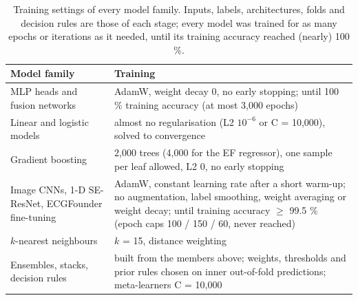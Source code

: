 \begin{table}[htbp]
\caption{Training settings of every model family. Inputs, labels, architectures, folds and decision rules are those of each stage; every model was trained for as many epochs or iterations as it needed, until its training accuracy reached (nearly) 100 \%.}\label{tab:3.6}
\small
\begin{tabular}{>{\raggedright\arraybackslash\hspace{0pt}}p{}>{\raggedright\arraybackslash\hspace{0pt}}p{}}
\toprule
\textbf{Model family} & \textbf{Training} \\
\midrule
MLP heads and fusion networks & AdamW, weight decay 0, no early stopping; until 100 \% training accuracy (at most 3,000 epochs) \\
Linear and logistic models & almost no regularisation (L2 $10^{-6}$ or C = 10,000), solved to convergence \\
Gradient boosting & 2,000 trees (4,000 for the EF regressor), one sample per leaf allowed, L2 0, no early stopping \\
Image CNNs, 1-D SE-ResNet, ECGFounder fine-tuning & AdamW, constant learning rate after a short warm-up; no augmentation, label smoothing, weight averaging or weight decay; until training accuracy $\ge$ 99.5 \% (epoch caps 100 / 150 / 60, never reached) \\
$k$-nearest neighbours & $k$ = 15, distance weighting \\
Ensembles, stacks, decision rules & built from the members above; weights, thresholds and prior rules chosen on inner out-of-fold predictions; meta-learners C = 10,000 \\
\bottomrule
\end{tabular}
\end{table}
